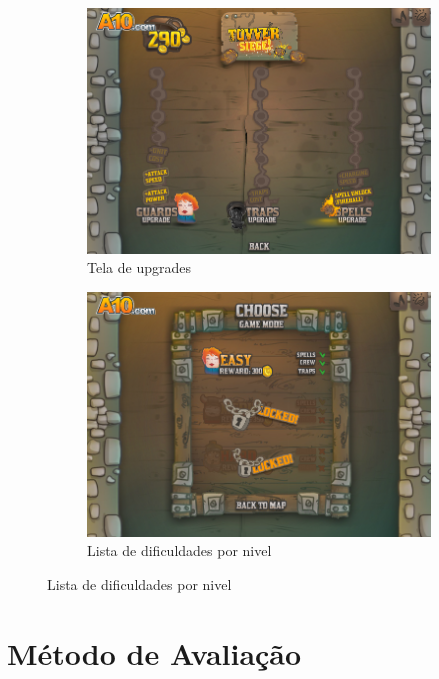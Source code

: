 \documentclass[12pt]{article}
\begin{document}
\begin{figure}[h]
\begin{subfigure}{0.5\textwidth}
\includegraphics[scale=0.3]{imagens/upgrades.png}
\caption{Tela de upgrades}
\label{fig:upgrades}
\end{subfigure}
\begin{subfigure}{0.5\textwidth}
\includegraphics[scale=0.3]{imagens/comecodificuldades.png} 
\caption{Lista de dificuldades por nivel}
\label{fig:comecodificuldades}
\end{subfigure}
\end{figure}
\newpage
\section{Método de Avaliação}
\end{document}
